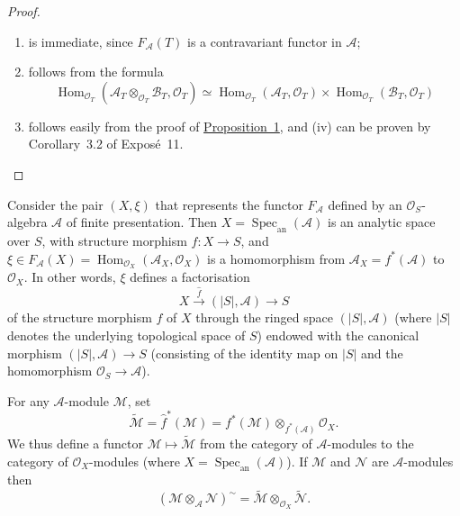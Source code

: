 \documentclass[british]{article}
\providecommand{\tightlist}{%
\setlength{\itemsep}{0pt}\setlength{\parskip}{0pt}}
\newcommand{\oldpage}[1]{\marginpar{\footnotesize$\Big\vert$ \textit{p.~#1}}}
\begin{document}
\begin{proof}
\leavevmode

\begin{enumerate}
\def\labelenumi{(\roman{enumi})}
\tightlist
\item
  is immediate, since \(F_{\mathscr{A}}(T)\) is a contravariant functor
  in \({\mathscr{A}}\);
\item
  follows from the formula \[
    \operatorname{Hom}_{{\mathscr{O}}_T}({\mathscr{A}}_T\otimes_{{\mathscr{O}}_T}{\mathscr{B}}_T,{\mathscr{O}}_T)
    \simeq \operatorname{Hom}_{{\mathscr{O}}_T}({\mathscr{A}}_T,{\mathscr{O}}_T)\times\operatorname{Hom}_{{\mathscr{O}}_T}({\mathscr{B}}_T,{\mathscr{O}}_T)
  \]
\item
  follows easily from the proof of
  \hyperref[proposition-1]{Proposition~1}, and (iv) can be proven by
  Corollary~3.2 of Exposé~11.
\end{enumerate}

\end{proof}

Consider the pair \((X,\xi)\) that represents the functor
\(F_{\mathscr{A}}\) defined by an \({\mathscr{O}}_S\)-algebra
\({\mathscr{A}}\) of finite presentation. Then
\(X=\operatorname{Spec}_\mathrm{an}({\mathscr{A}})\) is an analytic
space over \(S\), with structure morphism \(f\colon X\to S\), and
\(\xi\in F_{\mathscr{A}}(X)=\operatorname{Hom}_{{\mathscr{O}}_X}({\mathscr{A}}_X,{\mathscr{O}}_X)\)
is a homomorphism from \({\mathscr{A}}_X=f^*({\mathscr{A}})\) to
\({\mathscr{O}}_X\). In other words, \(\xi\) defines a factorisation \[
  X \xrightarrow{\hat{f}} (|S|,{\mathscr{A}}) \to S
\] of the structure morphism \(f\) of \(X\) through the ringed space
\((|S|,{\mathscr{A}})\) (where \(|S|\) denotes the underlying
topological space of \(S\)) endowed with the canonical morphism
\((|S|,{\mathscr{A}})\to S\) (consisting of the identity map on \(|S|\)
and the homomorphism \({\mathscr{O}}_S\to{\mathscr{A}}\)).

\oldpage{19-04}

For any \({\mathscr{A}}\)-module \({\mathscr{M}}\), set \[
  \widetilde{{\mathscr{M}}}
  = \hat{f}^*({\mathscr{M}})
  = f^*({\mathscr{M}})\otimes_{f^*({\mathscr{A}})}{\mathscr{O}}_X.
\] We thus define a functor
\({\mathscr{M}}\mapsto\widetilde{{\mathscr{M}}}\) from the category of
\({\mathscr{A}}\)-modules to the category of \({\mathscr{O}}_X\)-modules
(where \(X=\operatorname{Spec}_\mathrm{an}({\mathscr{A}})\)). If
\({\mathscr{M}}\) and \({\mathscr{N}}\) are \({\mathscr{A}}\)-modules
then \[
  ({\mathscr{M}}\otimes_{\mathscr{A}}{\mathscr{N}})^\sim
  = \widetilde{{\mathscr{M}}}\otimes_{{\mathscr{O}}_X}\widetilde{{\mathscr{N}}}.
\]
\end{document}
